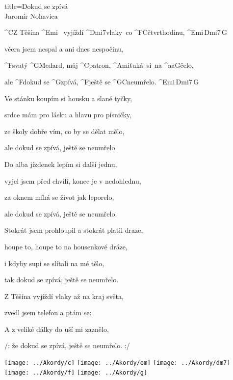 \begin{song}{title=\predtitle\centering Dokud se zpívá \\\large Jaromír Nohavica  \vspace*{-0.3cm}}  %
\begin{centerjustified}
\nejnejvetsi

\sloka
	^{C}Z Těšína ^{Emi\,\,\,\,\,}vyjíždí ^{Dmi7\z}vlaky~co ^{F{\z}C}čtvrthodinu, ^{Emi\,Dmi7\,G}

	včera jsem nespal a ani dnes nespočinu,

	^{F}svatý ^{G}Medard, můj ^{C}patron, ^{\z Ami\:\:\:}ťuká~si~na ^{{\color{white}aa}G}čelo,

	ale ^{F}dokud se ^{G}zpívá, ^{F}ještě se ^{G{\z}C}neumřelo. ^{Emi\,Dmi7\,G}

\sloka
	Ve stánku koupím si housku a slané tyčky,

	srdce mám pro lásku a hlavu pro písničky,

	ze školy dobře vím, co by se dělat mělo,

	ale dokud se zpívá, ještě se neumřelo.

\sloka
	Do alba jízdenek lepím si další jednu,

	vyjel jsem před chvílí, konec je v nedohlednu,

	za oknem míhá se život jak leporelo,

	ale dokud se zpívá, ještě se neumřelo.

\sloka
	Stokrát jsem prohloupil a stokrát platil draze,

	houpe to, houpe to na housenkové dráze,

	i kdyby supi se slítali na mé tělo,

	tak dokud se zpívá, ještě se neumřelo.

\sloka
	Z Těšína vyjíždí vlaky až na kraj světa,

	zvedl jsem telefon a ptám se: 

	A z veliké dálky do uší mi zaznělo,

	/: že dokud se zpívá, ještě se neumřelo. :/


\end{centerjustified}

\centering
\texttt{[image: ../Akordy/c]}
\texttt{[image: ../Akordy/em]}
\texttt{[image: ../Akordy/dm7]}
\texttt{[image: ../Akordy/f]}
\texttt{[image: ../Akordy/g]}

\setcounter{Slokočet}{0}
\end{song}
